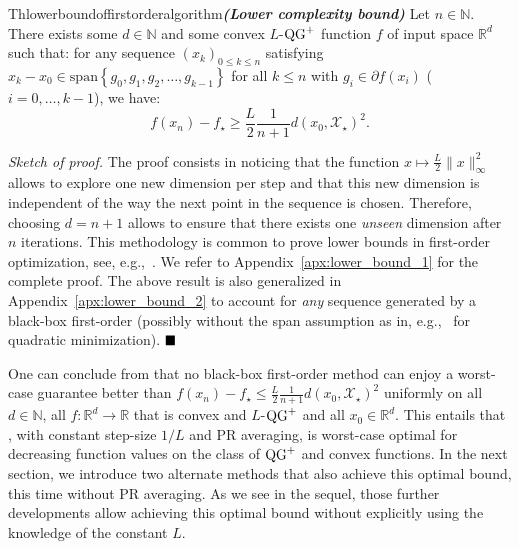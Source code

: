         \begin{center}
        \begin{restatable}{Th}{lowerboundoffirstorderalgorithm}\textbf{\emph{(Lower complexity bound)}}
            \label{thm:general_lower_bound}
            Let $n\in\mathbb{N}$.
            There exists some $d\in\mathbb{N}$ and some convex $L$-$\operatorname{QG}^+$ function $f$ of input space $\mathbb{R}^d$ such that: for any sequence $(x_k)_{0\le k\le n}$ satisfying $x_k - x_0 \in \text{span}\left\{g_0, g_1, g_2, \dots, g_{k-1}\right\}$ for all $k\leq n$ with $g_i \in \partial f(x_i)$ ($i=0,\ldots,k-1$), we have:
            \[f(x_n) - f_\star \geq \frac{L}{2}\frac{1}{n+1} d(x_0, \mathcal{X}_\star)^2.\]
        \end{restatable}
        \end{center}

        \noindent \textit{Sketch of proof.}
            The proof consists in noticing that the function $x \mapsto \frac{L}{2}\|x\|_\infty^2$ allows to explore one new dimension per step and that this new dimension is independent of the way the next point in the sequence is chosen.
            Therefore, choosing $d=n+1$ allows to ensure that there exists one \textit{unseen} dimension after $n$ iterations.
            This methodology is common to prove lower bounds in first-order optimization, see, e.g.,~\citep{nemirovskinotes1995,Nest03a,bubeck2014convex}.
            We refer to Appendix~\ref{apx:lower_bound_1} for the complete proof.
            The above result is also generalized in Appendix~\ref{apx:lower_bound_2} to account for \textit{any} sequence generated by a black-box first-order (possibly without the span assumption as in, e.g.,~\citep[Chapter 12]{nemirovskinotes1995} for quadratic minimization).
        $\hfill\blacksquare$

        One can conclude from  that no black-box first-order method can enjoy a worst-case guarantee better than $f(x_n) - f_\star \leq \frac{L}{2}\frac{1}{n+1} d(x_0, \mathcal{X}_\star)^2$ uniformly on all $d\in\mathbb{N}$, all $f:\mathbb{R}^d\rightarrow\mathbb{R}$ that is convex and $L$-$\operatorname{QG}^+$ and all $x_0\in\mathbb{R}^d$.
        This entails that , with constant step-size $1/L$ and PR averaging, is worst-case optimal for decreasing function values on the class of $\operatorname{QG}^+$ and convex functions.
        In the next section, we introduce two alternate methods that also achieve this optimal bound, this time without PR averaging.
        As we see in the sequel, those further developments allow achieving this optimal bound without explicitly using the knowledge of the constant $L$.
        
